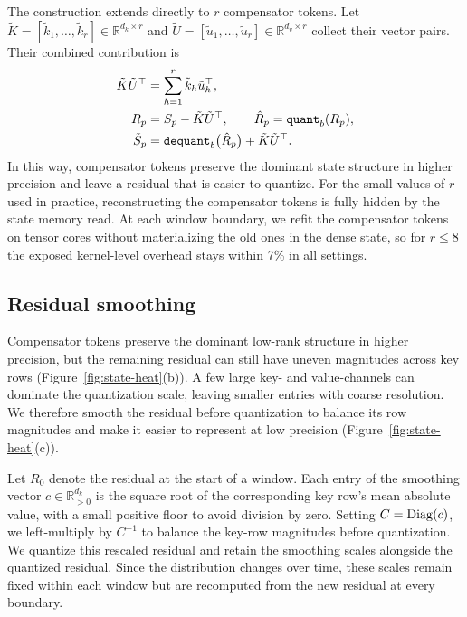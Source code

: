 The construction extends directly to $r$ compensator tokens.
Let $\tilde K=[\tilde k_1,\ldots,\tilde k_r]\in\mathbb{R}^{d_k\times r}$ and $\tilde U=[\tilde u_1,\ldots,\tilde u_r]\in\mathbb{R}^{d_v\times r}$ collect their vector pairs.
Their combined contribution is
\begin{equation}
  \begin{aligned}
    \tilde K\tilde U^{\top}
       &= \sum_{h=1}^{r}\tilde k_h\tilde u_h^{\top},\\
    R_p &= S_p-\tilde K\tilde U^{\top},
       \qquad \hat R_p=\operatorname{\mathtt{quant}}_b(R_p),\\
    \tilde S_p &= \operatorname{\mathtt{dequant}}_b\bigl(\hat R_p\bigr)
       +\tilde K\tilde U^{\top}.
  \end{aligned}
  \label{eq:compensator-rank-r}
\end{equation}
In this way, compensator tokens preserve the dominant state structure in higher precision and leave a residual that is easier to quantize.
For the small values of $r$ used in practice, reconstructing the compensator tokens is fully hidden by the state memory read.
At each window boundary, we refit the compensator tokens on tensor cores without materializing the old ones in the dense state, so for $r\le 8$ the exposed kernel-level overhead stays within 7\% in all settings.

\subsection{Residual smoothing}
\label{sec:round3}

Compensator tokens preserve the dominant low-rank structure in higher precision, but the remaining residual can still have uneven magnitudes across key rows (Figure~\ref{fig:state-heat}(b)).
A few large key- and value-channels can dominate the quantization scale, leaving smaller entries with coarse resolution.
We therefore smooth the residual before quantization to balance its row magnitudes and make it easier to represent at low precision (Figure~\ref{fig:state-heat}(c)).

Let $R_0$ denote the residual at the start of a window.
Each entry of the smoothing vector $c\in\mathbb{R}_{>0}^{d_k}$ is the square root of the corresponding key row's mean absolute value, with a small positive floor to avoid division by zero.
Setting $C=\operatorname{Diag}(c)$, we left-multiply by $C^{-1}$ to balance the key-row magnitudes before quantization.
We quantize this rescaled residual and retain the smoothing scales alongside the quantized residual.
Since the distribution changes over time, these scales remain fixed within each window but are recomputed from the new residual at every boundary.

